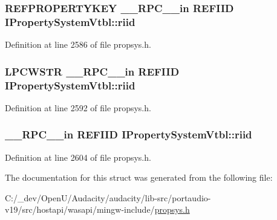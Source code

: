 \subsubsection[{\texorpdfstring{riid}{riid}}]{ {\bf R\+E\+F\+P\+R\+O\+P\+E\+R\+T\+Y\+K\+EY} {\bf \+\_\+\+\_\+\+R\+P\+C\+\_\+\+\_\+in} {\bf R\+E\+F\+I\+ID} I\+Property\+System\+Vtbl\+::riid}\hypertarget{struct_i_property_system_vtbl_a0ebf5886f23b11d5a77b176f1562b27b}{}\label{struct_i_property_system_vtbl_a0ebf5886f23b11d5a77b176f1562b27b}


Definition at line 2586 of file propsys.\+h.

\subsubsection[{\texorpdfstring{riid}{riid}}]{ {\bf L\+P\+C\+W\+S\+TR} {\bf \+\_\+\+\_\+\+R\+P\+C\+\_\+\+\_\+in} {\bf R\+E\+F\+I\+ID} I\+Property\+System\+Vtbl\+::riid}\hypertarget{struct_i_property_system_vtbl_aac0ce3818026e4c98281f171ecc252f8}{}\label{struct_i_property_system_vtbl_aac0ce3818026e4c98281f171ecc252f8}


Definition at line 2592 of file propsys.\+h.

\subsubsection[{\texorpdfstring{riid}{riid}}]{ {\bf \+\_\+\+\_\+\+R\+P\+C\+\_\+\+\_\+in} {\bf R\+E\+F\+I\+ID} I\+Property\+System\+Vtbl\+::riid}\hypertarget{struct_i_property_system_vtbl_a456c0b46d27e2fb3a7b5f5cfd3a93399}{}\label{struct_i_property_system_vtbl_a456c0b46d27e2fb3a7b5f5cfd3a93399}


Definition at line 2604 of file propsys.\+h.



The documentation for this struct was generated from the following file\+:\begin{DoxyCompactItemize}
\item 
C\+:/\+\_\+dev/\+Open\+U/\+Audacity/audacity/lib-\/src/portaudio-\/v19/src/hostapi/wasapi/mingw-\/include/\hyperlink{propsys_8h}{propsys.\+h}\end{DoxyCompactItemize}
